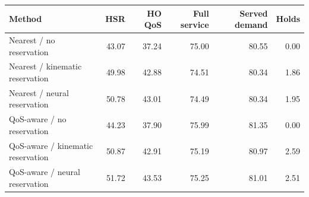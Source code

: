 \begin{tabular}{lrrrrr}
\toprule
Method & HSR & HO QoS & Full service & Served demand & Holds\\
\midrule
Nearest / no reservation & 43.07 & 37.24 & 75.00 & 80.55 & 0.00\\
Nearest / kinematic reservation & 49.98 & 42.88 & 74.51 & 80.34 & 1.86\\
Nearest / neural reservation & 50.78 & 43.01 & 74.49 & 80.34 & 1.95\\
QoS-aware / no reservation & 44.23 & 37.90 & 75.99 & 81.35 & 0.00\\
QoS-aware / kinematic reservation & 50.87 & 42.91 & 75.19 & 80.97 & 2.59\\
QoS-aware / neural reservation & 51.72 & 43.53 & 75.25 & 81.01 & 2.51\\
\bottomrule
\end{tabular}
